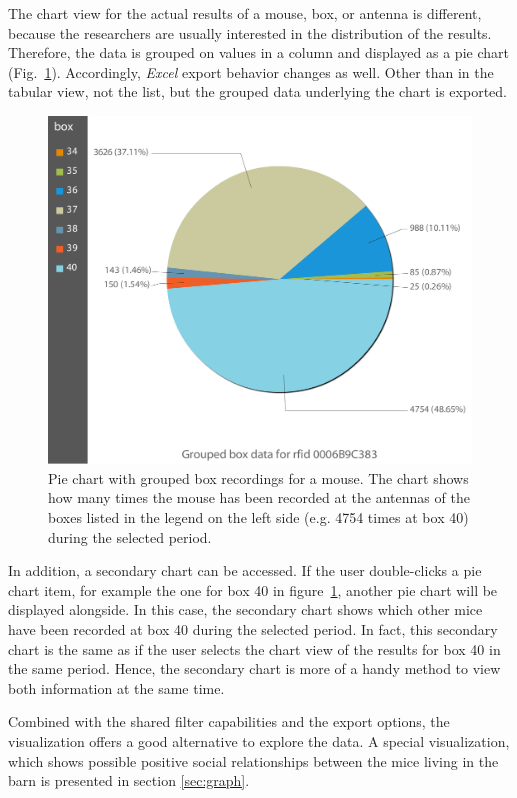 The chart view for the actual results of a mouse, box, or antenna is different, because the researchers are usually interested in the distribution of the results. Therefore, the data is grouped on values in a column and displayed as a pie chart (Fig.~\ref{fig:pie_chart_for_mouse}). Accordingly, \textit{Excel} export behavior changes as well. Other than in the tabular view, not the list, but the grouped data underlying the chart is exported.

\begin{figure}[htbp]
\begin{center}
  \includegraphics[width=.66\textwidth]{assets/img/pie_chart_for_mouse.png}
  \caption[Pie chart showing box recorings for a mouse]{Pie chart with grouped box recordings for a mouse. The chart shows how many times the mouse has been recorded at the antennas of the boxes listed in the legend on the left side (e.g. 4754 times at box 40) during the selected period.}
  \label{fig:pie_chart_for_mouse}
\end{center}
\end{figure}

In addition, a secondary chart can be accessed. If the user double-clicks a pie chart item, for example the one for box 40 in figure~\ref{fig:pie_chart_for_mouse}, another pie chart will be displayed alongside. In this case, the secondary chart shows which other mice have been recorded at box 40 during the selected period. In fact, this secondary chart is the same as if the user selects the chart view of the results for box 40 in the same period. Hence, the secondary chart is more of a handy method to view both information at the same time.

Combined with the shared filter capabilities and the export options, the visualization offers a good alternative to explore the data. A special visualization, which shows possible positive social relationships between the mice living in the barn is presented in section \ref{sec:graph}.

